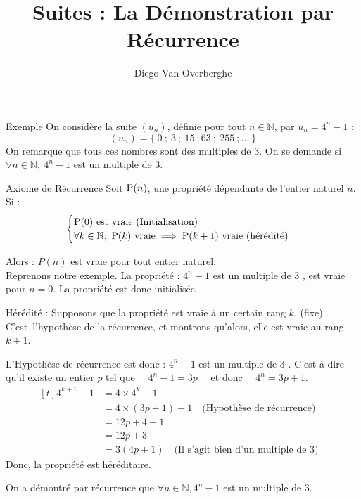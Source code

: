 \documentclass{cours}
\title{Suites : La Démonstration par Récurrence}
\author{Diego Van Overberghe}
\begin{document}

    \begin{Gpartie}{Exemple}
        On considère la suite $\left(u_n\right)$, définie pour tout $n\in\mathbb{N}$, par $u_n=4^n-1$ :
            \[\left(u_n\right)=\big\{~0~;~3~;~15~;63~;~255~;\dotsc~\big\}\]
        On remarque que tous ces nombres sont des multiples de 3. On se demande si $\forall n\in\mathbb{N},~4^n-1$ est un multiple de 3.
    \end{Gpartie}
    \begin{Gpartie}{Axiome de Récurrence}
        Soit $\mathrm{P}(n)$, une propriété dépendante de l'entier naturel $n$.\\
        Si :
        \[\begin{cases}
            \mathrm{P}(0)\text{ est vraie (Initialisation)} \\ \forall k\in\mathbb{N},~\mathrm{P}(k)\text{ vraie}\implies\mathrm{P}(k+1)\text{ vraie (hérédité)}
        \end{cases}\]

        Alors : $P(n)$ est vraie pour tout entier naturel. \\[4ex]
        Reprenons notre exemple. La propriété : \og $4^n-1$ est un multiple de 3 \fg{}, est vraie pour $n=0$. La propriété est donc initialisée.
        
        Hérédité : Supposons que la propriété est vraie à un certain rang $k$, (fixe). C'est~l'hypothèse de la récurrence, et montrons qu'alors, elle est vraie au rang $k+1$.
        
        L'Hypothèse de récurrence est donc : \og $4^n-1$ est un multiple de 3 \fg{}. C'est-à-dire qu'il existe un entier $p$ tel que $\quad4^n-1=3p\quad$ et donc $\quad4^n=3p+1$.
        \[\begin{aligned}[t]
            4^{k+1}-1&=4\times 4^k-1 &\\
            &= 4\times\left(3p+1\right)-1 \quad \text{(Hypothèse de récurrence)} &\\
            &=12p+4-1 &\\
            &=12p+3 &\\
            &=3\left(4p+1\right) \quad \text{(Il s'agit bien d'un multiple de 3)}
        \end{aligned}\]
        Donc, la propriété est héréditaire.

        On a démontré par récurrence que $\forall n\in\mathbb{N},4^n-1$ est un multiple de 3.
    \end{Gpartie}
\end{document}
